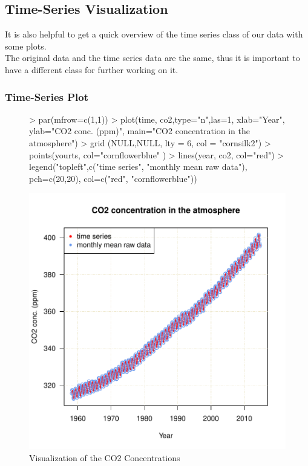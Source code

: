 \documentclass[11pt, a4paper]{article} %
\begin{document}
\subsection{Time-Series Visualization}%
It is  also helpful to get a quick overview of the time series class of our data with some plots.\\ 
The original data and the time series data are the same, thus it is important to have a different class for further working on it. \\
\subsubsection{Time-Series Plot}
\begin{figure}[H]
\centering
\begin{Schunk}
\begin{Sinput}
> par(mfrow=c(1,1))
> plot(time, co2,type="n",las=1, xlab="Year", ylab="CO2 conc. (ppm)",
         main="CO2 concentration in the atmosphere")
> grid (NULL,NULL, lty = 6, col = "cornsilk2")
> points(yourts, col="cornflowerblue" )
> lines(year, co2, col="red")
> legend("topleft",c("time series", "monthly mean raw data"),
 pch=c(20,20), col=c("red", "cornflowerblue"))
\end{Sinput}
\end{Schunk}
\includegraphics{alleselena-fig1visualize}
\caption{Visualization of the CO2 Concentrations}
\label{fig1visualize}
\end{figure}
\end{document}
